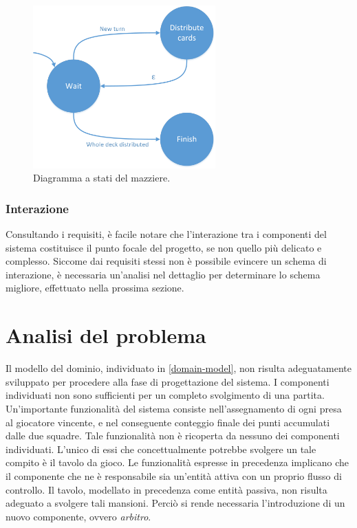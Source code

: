\documentclass[a4paper,12pt]{article}
\begin{document}
\begin{figure}[H]
	\hspace*{-0.7in}
	\centering
	\includegraphics[width=70mm]{./img/dealer_state_diagram.png}
	\caption{Diagramma a stati del mazziere.  \label{dealer-state-diagram}}
\end{figure}

\subsubsection{Interazione}

Consultando i requisiti, è facile notare che l'interazione tra i componenti del sistema costituisce il punto focale del progetto, se non quello più delicato e complesso. Siccome dai requisiti stessi non è possibile evincere un schema di interazione, è necessaria un'analisi nel dettaglio per determinare lo schema migliore, effettuato nella prossima sezione.  

\section{Analisi del problema} \label{problem-analysis}
Il modello del dominio, individuato in \autoref{domain-model}, non risulta adeguatamente sviluppato per procedere alla fase di progettazione del sistema. I componenti individuati non sono sufficienti per un completo svolgimento di una partita. Un'importante funzionalità del sistema consiste nell'assegnamento di ogni presa al giocatore vincente, e nel conseguente conteggio finale dei punti accumulati dalle due squadre. Tale funzionalità non è ricoperta da nessuno dei componenti individuati. L'unico di essi che concettualmente potrebbe svolgere un tale compito è il tavolo da gioco. Le funzionalità espresse in precedenza implicano che il componente che ne è responsabile sia un'entità attiva con un proprio flusso di controllo. Il tavolo, modellato in precedenza come entità passiva, non risulta adeguato a svolgere tali mansioni. Perciò si rende necessaria l'introduzione di un nuovo componente, ovvero \emph{arbitro}.
\end{document}
